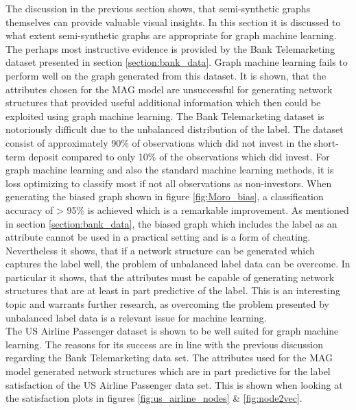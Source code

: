   The discussion in the previous section shows, that semi-synthetic graphs
  themselves can provide valuable visual insights. In this section it is
  discussed to what extent semi-synthetic graphs are appropriate for graph
  machine learning. The perhaps most instructive evidence is provided by the Bank
  Telemarketing dataset presented in section \ref{section:bank_data}. Graph
  machine learning fails to perform well on the graph generated from this
  dataset. It is shown, that the attributes chosen for the MAG model are
  unsuccessful for generating network structures that provided useful additional
  information which then could be exploited using graph machine learning. The 
  Bank Telemarketing dataset is notoriously difficult due to the unbalanced
  distribution of the label. The dataset consist of approximately 90\% of
  observations which did not invest in the short-term deposit compared to only 
  10\% of the observations which did invest. For graph machine learning and
  also the standard machine learning methods, it is loss optimizing to
  classify most if not all observations as non-investors. When generating the
  biased graph shown in figure \ref{fig:Moro_bias}, a classification accuracy
  of > 95\% is achieved which is a remarkable improvement. As mentioned in 
  section \ref{section:bank_data}, the biased graph which includes the label
  as an attribute cannot be used in a practical setting and is a form of
  cheating. Nevertheless it shows, that if a network structure can be generated
  which captures the label well, the problem of unbalanced label data can be
  overcome. In particular it shows, that the attributes must be capable of
  generating network structures that are at least in part predictive of the
  label. This is an interesting topic and warrants further research, as
  overcoming the problem presented by unbalanced label data is a relevant issue
  for machine learning. \\

  \noindent The US Airline Passenger dataset is shown to be well suited for 
  graph machine learning. The reasons for its success are in line with the 
  previous discussion regarding the Bank Telemarketing data set. The attributes 
  used for the MAG model generated network structures which are in part 
  predictive for the label satisfaction of the US Airline Passenger data set. 
  This is shown when looking at the satisfaction plots in figures 
  \ref{fig:us_airline_nodes} \& \ref{fig:node2vec}. \\ 

